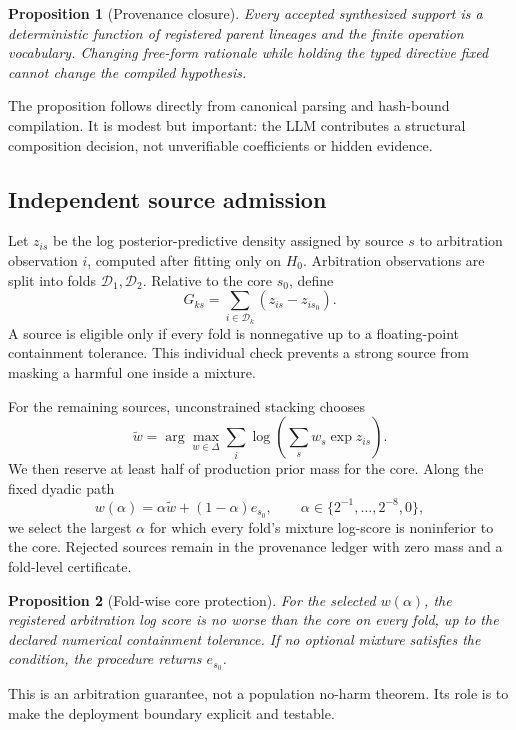 \documentclass[twoside]{article}
\newcommand{\Dcal}{\mathcal D}
\newtheorem{proposition}{Proposition}
\begin{document}
\begin{proposition}[Provenance closure]
Every accepted synthesized support is a deterministic function of registered
parent lineages and the finite operation vocabulary. Changing free-form
rationale while holding the typed directive fixed cannot change the compiled
hypothesis.
\end{proposition}

The proposition follows directly from canonical parsing and hash-bound
compilation. It is modest but important: the LLM contributes a structural
composition decision, not unverifiable coefficients or hidden evidence.

\subsection{Independent source admission}

Let \(z_{is}\) be the log posterior-predictive density assigned by source
\(s\) to arbitration observation \(i\), computed after fitting only on
\(H_0\). Arbitration observations are split into folds
\(\Dcal_1,\Dcal_2\). Relative to the core \(s_0\), define
\[
 G_{ks}=\sum_{i\in\Dcal_k}(z_{is}-z_{is_0}).
\]
A source is eligible only if every fold is nonnegative up to a
floating-point containment tolerance. This individual check prevents a
strong source from masking a harmful one inside a mixture.

For the remaining sources, unconstrained stacking chooses
\[
 \widetilde w=\arg\max_{w\in\Delta}
 \sum_i \log\!\left(\sum_s w_s\exp z_{is}\right).
\]
We then reserve at least half of production prior mass for the core. Along
the fixed dyadic path
\[
 w(\alpha)=\alpha\widetilde w+(1-\alpha)e_{s_0},
 \qquad
 \alpha\in\{2^{-1},\ldots,2^{-8},0\},
\]
we select the largest \(\alpha\) for which every fold's mixture log-score is
noninferior to the core. Rejected sources remain in the provenance ledger
with zero mass and a fold-level certificate.

\begin{proposition}[Fold-wise core protection]
For the selected \(w(\alpha)\), the registered arbitration log score is no
worse than the core on every fold, up to the declared numerical containment
tolerance. If no optional mixture satisfies the condition, the procedure
returns \(e_{s_0}\).
\end{proposition}

This is an arbitration guarantee, not a population no-harm theorem. Its role
is to make the deployment boundary explicit and testable.
\end{document}
